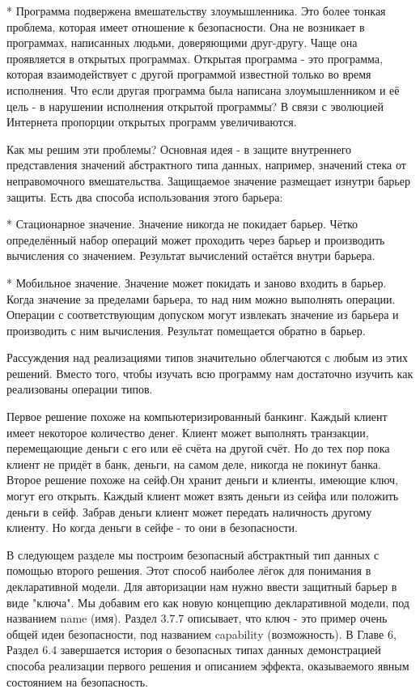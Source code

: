 * Программа подвержена вмешательству злоумышленника. Это более тонкая проблема, которая имеет отношение к безопасности. Она не возникает в программах, написанных людьми, доверяющими друг-другу. Чаще она проявляется в открытых программах. Открытая программа - это программа, которая взаимодействует с другой программой известной только во время исполнения. Что если другая программа была написана злоумышленником и её цель - в нарушении исполнения открытой программы? В связи с эволюцией Интернета пропорции открытых программ увеличиваются.

Как мы решим эти проблемы? Основная идея - в защите внутреннего представления значений абстрактного типа данных, например, значений стека от неправомочного вмешательства. Защищаемое значение размещает изнутри барьер защиты. Есть два способа использования этого барьера:

* Стационарное значение. Значение никогда не покидает барьер. Чётко определённый набор операций может проходить через барьер и производить вычисления со значением. Результат вычислений остаётся внутри барьера.

* Мобильное значение. Значение может покидать и заново входить в барьер. Когда значение за пределами барьера, то над ним можно выполнять операции. Операции с соответствующим допуском могут извлекать значение из барьера и производить с ним вычисления. Результат помещается обратно в барьер.

Рассуждения над реализациями типов значительно облегчаются с любым из этих решений. Вместо того, чтобы изучать всю программу нам достаточно изучить как реализованы операции типов.

Первое решение похоже на компьютеризированный банкинг. Каждый клиент имеет некоторое количество денег. Клиент может выполнять транзакции, перемещающие деньги с его или её счёта на другой счёт. Но до тех пор пока клиент не придёт в банк, деньги, на самом деле, никогда не покинут банка. Второе решение похоже на сейф.Он хранит деньги и клиенты, имеющие ключ, могут его открыть. Каждый клиент может взять деньги из сейфа или положить деньги в сейф. Забрав деньги клиент может передать наличность другому клиенту. Но когда деньги в сейфе - то они в безопасности.

В следующем разделе мы построим безопасный абстрактный тип данных с помощью второго решения. Этот способ наиболее лёгок для понимания в декларативной модели. Для авторизации нам нужно ввести защитный барьер в виде "ключа". Мы добавим его как новую концепцию декларативной модели, под названием name (имя). Раздел 3.7.7 описывает, что ключ - это пример очень общей идеи безопасности, под названием capability (возможность). В Главе 6, Раздел 6.4 завершается история о безопасных типах данных демонстрацией способа реализации первого решения и описанием эффекта, оказываемого явным состоянием на безопасность.


